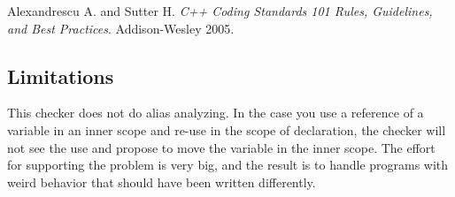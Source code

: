 Alexandrescu A. and Sutter H. {\it C++ Coding Standards 101 Rules, Guidelines, and Best Practices}. Addison-Wesley 2005.

\subsection{Limitations}
\label{section:LocalizedVariablesChecker::limitations}

This checker does not do alias analyzing. In the case you use a reference
of a variable in an inner scope and re-use in the scope of declaration,
the checker will not see the use and propose to move the variable in the
inner scope. The effort for supporting the problem is very big, and the
result is to handle programs with weird behavior that should have been
written differently.

